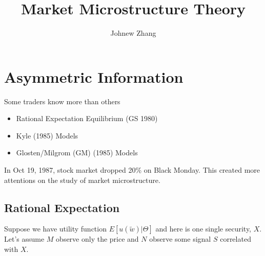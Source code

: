 \documentclass[11pt, a4paper, oneside]{article}
\title{Market Microstructure Theory}
\author{Johnew Zhang}
\theoremstyle{definition}
\theoremstyle{proposition}
\theoremstyle{corollary}
\theoremstyle{lemma}
\theoremstyle{theorem}
\begin{document}
 

\def\angl#1{{%
\vbox{\hrule height .2pt 
\kern 1pt 
\hbox{$\scriptstyle {#1}\kern 1pt$}%
}\kern-.05pt \vrule width .2pt 
}} 

\def\tcelife#1{{\buildrel \circ \over e}_{#1}}

\maketitle

\hline

\tableofcontents
\addcontentsline 

\newpage

\section{Asymmetric Information}
Some traders know more than others 
\begin{itemize}
\item Rational Expectation Equilibrium (GS 1980)
\item Kyle (1985) Models
\item Glosten/Milgrom (GM) (1985) Models
\end{itemize}

In Oct 19, 1987, stock market dropped 20\% on Black Monday. This created more attentions on the study of market microstructure. 

\subsection{Rational Expectation}
Suppose we have utility function $E[u(\tilde{w})|\Theta]$ and here is one single security, $X$. Let's assume $M$ observe only the price and $N$ observe some signal $S$ correlated with $X$. 
\end{document}
